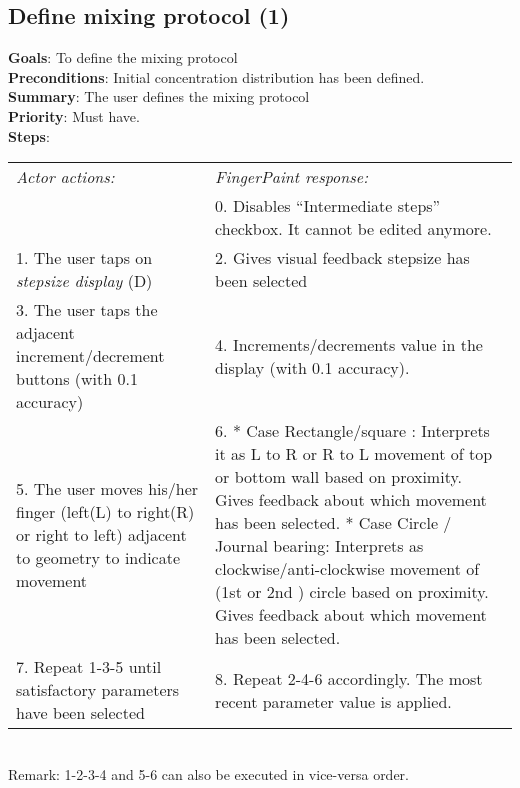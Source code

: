 \begin{appendices}
  \section{Define mixing protocol (1)}
  \textbf{Goals}: To define the mixing protocol\\
  \textbf{Preconditions}: Initial concentration distribution has been defined.\\
  \textbf{Summary}: The user defines the mixing protocol\\
  \textbf{Priority}: Must have.\\
  \textbf{Steps}: \\
  \begin{tabular}{ p{} p{} }
  	\emph{Actor actions:} & \emph{FingerPaint response:} \\
    & 0.     Disables “Intermediate steps” checkbox. It cannot be edited anymore.\\
    1. The user taps on \emph{stepsize display} (D) & 2.	Gives visual feedback stepsize has been selected\\
    3. The user taps the adjacent increment/decrement buttons (with 0.1 accuracy) & 4.	Increments/decrements value in the display (with 0.1 accuracy). \\
    5. The user moves his/her finger (left(L) to right(R) or right to left) adjacent to geometry to indicate movement & 6.	* Case Rectangle/square : Interprets it as L to R or R to L movement of top or bottom wall based on proximity. Gives feedback about which movement has been selected. * Case Circle / Journal bearing: Interprets as clockwise/anti-clockwise movement of (1st or 2nd ) circle based on proximity. Gives feedback about which movement has been selected.\\
    7.	Repeat 1-3-5 until satisfactory parameters have been selected & 8.	Repeat 2-4-6 accordingly. The most recent parameter value is applied.\\
  \end{tabular}
\\Remark: 1-2-3-4 and 5-6 can also be executed in vice-versa order.


\end{appendices}
